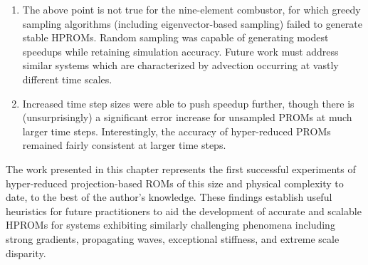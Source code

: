 \begin{enumerate}
    \item The above point is not true for the nine-element combustor, for which greedy sampling algorithms (including eigenvector-based sampling) failed to generate stable HPROMs. Random sampling was capable of generating modest speedups while retaining simulation accuracy. Future work must address similar systems which are characterized by advection occurring at vastly different time scales.
    \item Increased time step sizes were able to push speedup further, though there is (unsurprisingly) a significant error increase for unsampled PROMs at much larger time steps. Interestingly, the accuracy of hyper-reduced PROMs remained fairly consistent at larger time steps.
\end{enumerate}

The work presented in this chapter represents the first successful experiments of hyper-reduced projection-based ROMs of this size and physical complexity to date, to the best of the author's knowledge. These findings establish useful heuristics for future practitioners to aid the development of accurate and scalable HPROMs for systems exhibiting similarly challenging phenomena including strong gradients, propagating waves, exceptional stiffness, and extreme scale disparity.